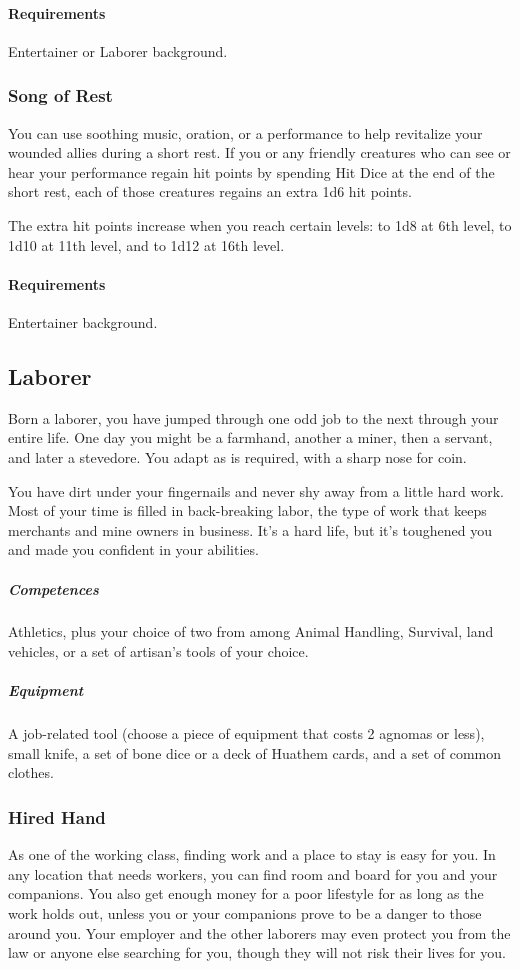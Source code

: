             \paragraph{Requirements} Entertainer or Laborer background.
        \subsubsection{Song of Rest} \label{feat::songofrest}
            You can use soothing music, oration, or a performance to help revitalize your wounded allies during a short rest.
            If you or any friendly creatures who can see or hear your performance regain hit points by spending Hit Dice at the end of the short rest, each of those creatures regains an extra 1d6 hit points.

            The extra hit points increase when you reach certain levels: to 1d8 at 6th level, to 1d10 at 11th level, and to 1d12 at 16th level.
            \paragraph{Requirements} Entertainer background.
\subsection*{Laborer} \label{ssec::laborer}
    Born a laborer, you have jumped through one odd job to the next through your entire life.
    One day you might be a farmhand, another a miner, then a servant, and later a stevedore.
    You adapt as is required, with a sharp nose for coin.

    You have dirt under your fingernails and never shy away from a little hard work.
    Most of your time is filled in back-breaking labor, the type of work that keeps merchants and mine owners in business.%
    It’s a hard life, but it’s toughened you and made you confident in your abilities.

    \subparagraph{Competences} Athletics, plus your choice of two from among Animal Handling, Survival, land vehicles, or a set of artisan's tools of your choice.

    \subparagraph{Equipment} A job-related tool (choose a piece of equipment that costs 2 agnomas or less), small knife, a set of bone dice or a deck of Huathem cards, and a set of common clothes.

    \subsubsection{Hired Hand}
        As one of the working class, finding work and a place to stay is easy for you.
        In any location that needs workers, you can find room and board for you and your companions.
        You also get enough money for a poor lifestyle for as long as the work holds out, unless you or your companions prove to be a danger to those around you.
        Your employer and the other laborers may even protect you from the law or anyone else searching for you, though they will not risk their lives for you.

